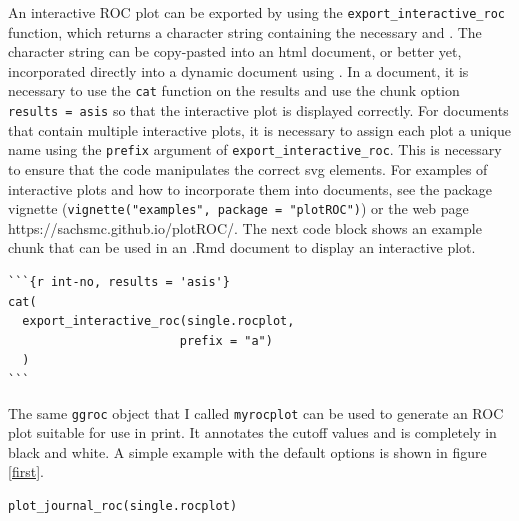 \documentclass[article]{jss}
\begin{document}
An interactive ROC plot can be exported by using the
\texttt{export\_interactive\_roc} function, which returns a character
string containing the necessary  and
. The character string can be copy-pasted into an
html document, or better yet, incorporated directly into a dynamic
document using  \citep{knitr}. In a  document, it
is necessary to use the \texttt{cat} function on the results and use the
chunk option \texttt{results = \textquotesingle{}asis\textquotesingle{}}
so that the interactive plot is displayed correctly. For documents that
contain multiple interactive plots, it is necessary to assign each plot
a unique name using the \texttt{prefix} argument of
\texttt{export\_interactive\_roc}. This is necessary to ensure that the
 code manipulates the correct svg elements. For
examples of interactive plots and how to incorporate them into
 documents, see the package vignette
(\texttt{vignette("examples", package = "plotROC")}) or the web page
https://sachsmc.github.io/plotROC/. The next code block shows an example
 chunk that can be used in an .Rmd document to display an
interactive plot.

\begin{verbatim}
```{r int-no, results = 'asis'}
cat(
  export_interactive_roc(single.rocplot, 
                        prefix = "a")
  )
```
\end{verbatim}

The same \texttt{ggroc} object that I called \texttt{myrocplot} can be
used to generate an ROC plot suitable for use in print. It annotates the
cutoff values and is completely in black and white. A simple example
with the default options is shown in figure \ref{first}.

\begin{verbatim}
plot_journal_roc(single.rocplot)
\end{verbatim}
\end{document}
